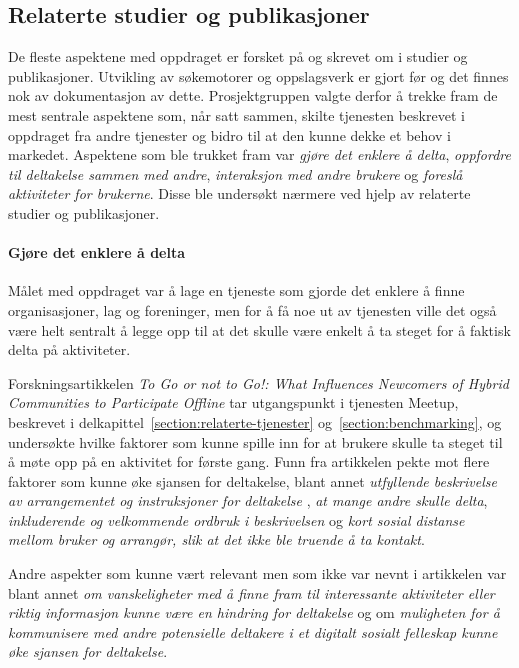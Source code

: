 \subsection{Relaterte studier og publikasjoner}
De fleste aspektene med oppdraget er forsket på og skrevet om i studier og publikasjoner. Utvikling av søkemotorer og oppslagsverk er gjort før og det finnes nok av dokumentasjon av dette. Prosjektgruppen valgte derfor å trekke fram de mest sentrale aspektene som, når satt sammen, skilte tjenesten beskrevet i oppdraget fra andre tjenester og bidro til at den kunne dekke et behov i markedet. Aspektene som ble trukket fram var {\em gjøre det enklere å delta}, {\em oppfordre til deltakelse sammen med andre}, {\em interaksjon med andre brukere} og {\em foreslå aktiviteter for brukerne}. Disse ble undersøkt nærmere ved hjelp av relaterte studier og publikasjoner.

\paragraph{Gjøre det enklere å delta}
Målet med oppdraget var å lage en tjeneste som gjorde det enklere å finne organisasjoner, lag og foreninger, men for å få noe ut av tjenesten ville det også være helt sentralt å legge opp til at det skulle være enkelt å ta steget for å faktisk delta på aktiviteter. 

Forskningsartikkelen {\em To Go or not to Go!: What Influences Newcomers of Hybrid Communities to Participate Offline} \cite{NEWCOMERS:4:CT17} tar utgangspunkt i tjenesten Meetup, beskrevet i delkapittel~\ref{section:relaterte-tjenester} og~\ref{section:benchmarking}, og undersøkte hvilke faktorer som kunne spille inn for at brukere skulle ta steget til å møte opp på en aktivitet for første gang. Funn fra artikkelen pekte mot flere faktorer som kunne øke sjansen for deltakelse, blant annet {\em utfyllende beskrivelse av arrangementet og instruksjoner for deltakelse
}, {\em at mange andre skulle delta}, {\em inkluderende og velkommende ordbruk i beskrivelsen} og {\em kort sosial distanse mellom bruker og arrangør, slik at det ikke ble truende å ta kontakt}. 

Andre aspekter som kunne vært relevant men som ikke var nevnt i artikkelen var blant annet {\em om vanskeligheter med å finne fram til interessante aktiviteter eller riktig informasjon kunne være en hindring for deltakelse} og om {\em muligheten for å kommunisere med andre potensielle deltakere i et digitalt sosialt felleskap kunne øke sjansen for deltakelse}.

